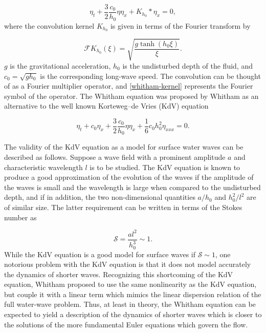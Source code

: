 \begin{equation}
\eta_t + \frac{3}{2} \frac{c_0}{h_0} \eta \eta_x + K_{h_0} \ast \eta_x = 0, 
\label{whitham-equation}
\end{equation}
where the convolution kernel $K_{h_0}$ is given in terms of the Fourier
transform by

\begin{equation}
\mathcal{F}K_{h_0} (\xi) =  \sqrt{\frac{g \tanh(h_0\xi)}{\xi}}.
\label{whitham-kernel}
\end{equation}
$g$ is the gravitational acceleration, $h_0$ is the undisturbed depth of
the fluid, and $c_0 = \sqrt{gh_0}$ is the corresponding long-wave speed.
The convolution can be thought of as a Fourier multiplier operator,
and \eqref{whitham-kernel} represents the Fourier symbol of the operator.
The Whitham equation was proposed by Whitham \cite{Whitham1967} as an
alternative to the well known Korteweg–de Vries (KdV) equation

\begin{equation}
\eta_t + c_0 \eta_x + \frac{3}{2} \frac{c_0}{h_0} \eta \eta_x + \frac{1}{6} c_0 h_0^2 \eta_{xxx} = 0.
\label{kdv-equation}
\end{equation}


The validity of the KdV equation as a model for surface water waves
can be described as follows. Suppose a wave field with a prominent
amplitude $a$ and characteristic wavelength $l$ is to be studied. The
KdV equation is known to produce a good approximation of the
evolution of the waves if the amplitude of the waves is small and
the wavelength is large when compared to the undisturbed depth,
and if in addition, the two non-dimensional quantities $a / h_0$ and
$h_0^2 / l^2$ are of similar size. The latter requirement can be written in
terms of the Stokes number as

\begin{equation}
\mathcal{S} = \frac{a l^2}{h_0^3} \sim 1. 
\label{stockes-number}
\end{equation}
While the KdV equation is a good model for surface waves if $\mathcal{S} \sim 1$, 
one notorious problem with the KdV equation is that it does
not model accurately the dynamics of shorter waves. Recognizing
this shortcoming of the KdV equation, Whitham proposed to use
the same nonlinearity as the KdV equation, but couple it with a
linear term which mimics the linear dispersion relation of the full
water-wave problem. Thus, at least in theory, the Whitham
equation can be expected to yield a description of the dynamics
of shorter waves which is closer to the solutions of the more
fundamental Euler equations which govern the flow.

